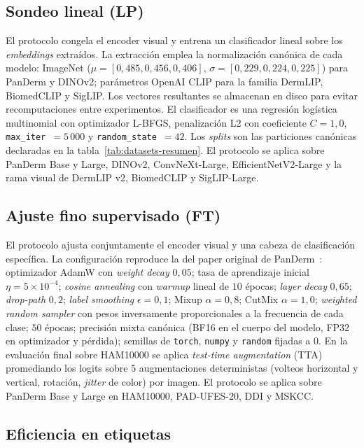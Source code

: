 \subsection{Sondeo lineal (LP)}
\label{sec:lp}

El protocolo congela el encoder visual y entrena un clasificador
lineal sobre los \emph{embeddings} extraídos. La extracción emplea
la normalización canónica de cada modelo: ImageNet
($\mu=[0{,}485, 0{,}456, 0{,}406]$,
$\sigma=[0{,}229, 0{,}224, 0{,}225]$) para PanDerm y DINOv2;
parámetros OpenAI CLIP para la familia DermLIP, BiomedCLIP y
SigLIP. Los vectores resultantes se almacenan en disco para evitar
recomputaciones entre experimentos. El clasificador es una
regresión logística multinomial con optimizador L-BFGS, penalización
L2 con coeficiente $C = 1{,}0$, \texttt{max\_iter}~$=5\,000$ y
\texttt{random\_state}~$=42$. Los \emph{splits} son las particiones
canónicas declaradas en la tabla~\ref{tab:datasets-resumen}. El
protocolo se aplica sobre PanDerm Base y Large, DINOv2,
ConvNeXt-Large, EfficientNetV2-Large y la rama visual de DermLIP v2,
BiomedCLIP y SigLIP-Large.

\subsection{Ajuste fino supervisado (FT)}
\label{sec:ft}

El protocolo ajusta conjuntamente el encoder visual y una cabeza de
clasificación específica. La configuración reproduce la del paper
original de PanDerm~\cite{panderm2025}: optimizador AdamW con
\emph{weight decay} $0{,}05$; tasa de aprendizaje inicial
$\eta = 5\times 10^{-4}$; \emph{cosine annealing} con
\emph{warmup} lineal de $10$ épocas; \emph{layer decay}
$0{,}65$; \emph{drop-path} $0{,}2$;
\emph{label smoothing} $\epsilon = 0{,}1$;
Mixup $\alpha = 0{,}8$; CutMix $\alpha = 1{,}0$;
\emph{weighted random sampler} con pesos inversamente proporcionales
a la frecuencia de cada clase; $50$ épocas; precisión mixta
canónica (BF16 en el cuerpo del modelo, FP32 en optimizador y
pérdida); semillas de \texttt{torch}, \texttt{numpy} y
\texttt{random} fijadas a $0$. En la evaluación final sobre
HAM10000 se aplica \emph{test-time augmentation} (TTA) promediando
los logits sobre $5$ augmentaciones deterministas (volteos
horizontal y vertical, rotación, \emph{jitter} de color) por
imagen. El protocolo se aplica sobre PanDerm Base y Large en
HAM10000, PAD-UFES-20, DDI y MSKCC.

\subsection{Eficiencia en etiquetas}
\label{sec:label-eff}

